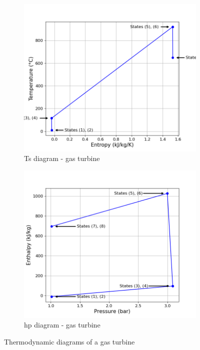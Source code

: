 \begin{figure}[h]
     \centering
     \begin{subfigure}[b]{0.4\textwidth}
         \centering
         \includegraphics[width=\textwidth]{Ts_GT}
         \caption{Ts diagram - gas turbine}
         \label{fig:C4_Ts_GT}
     \end{subfigure}
     \begin{subfigure}[b]{0.4\textwidth}
         \centering
         \includegraphics[width=\textwidth]{hp_GT}
         \caption{hp diagram - gas turbine}
         \label{fig:C4_hp_GT}
     \end{subfigure}
        \caption{Thermodynamic diagrams of a gas turbine}
        \label{fig:C4_thermo_diagram_GT}
\end{figure}\newpage


